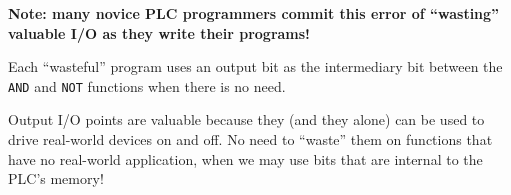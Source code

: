 \vskip 10pt

\noindent
{\bf Note: many novice PLC programmers commit this error of ``wasting'' valuable I/O as they write their programs!}







Each ``wasteful'' program uses an output bit as the intermediary bit between the {\tt AND} and {\tt NOT} functions when there is no need.  







Output I/O points are valuable because they (and they alone) can be used to drive real-world devices on and off.  No need to ``waste'' them on functions that have no real-world application, when we may use bits that are internal to the PLC's memory!




